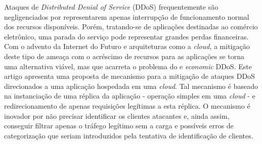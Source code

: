 Ataques de \emph{Distributed Denial of Service} (DDoS) frequentemente são negligenciados por representarem apenas interrupção de funcionamento normal dos recursos disponíveis. Porém, tratando-se de aplicações destinadas ao comércio eletrônico, uma parada do serviço pode representar grandes perdas financeiras. Com o advento da Internet do Futuro e arquiteturas como a \emph{cloud}, a mitigação deste tipo de ameaça com o acréscimo de recursos para as aplicações se torna uma alternativa viável, mas que acarreta o problema do e \emph{economic} DDoS. Este artigo apresenta uma proposta de mecanismo para a mitigação de ataques DDoS direcionados a uma aplicação hospedada em uma \emph{cloud}. Tal mecanismo é baseado na instanciação de uma réplica da aplicação - operação simples em uma \emph{cloud} - e redirecionamento de apenas requisições legítimas a esta réplica. O mecanismo é inovador por não precisar identificar os clientes atacantes e, ainda assim, conseguir filtrar apenas o tráfego legítimo sem a carga e possíveis erros de categorização que seriam introduzidos pela tentativa de identificação de clientes.
